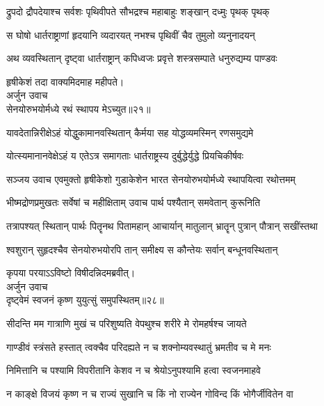 \twolineshloka
{द्रुपदो द्रौपदेयाश्च सर्वशः पृथिवीपते}
{सौभद्रश्च महाबाहुः शङ्खान् दध्मुः पृथक् पृथक्}%

\twolineshloka
{स घोषो धार्तराष्ट्राणां हृदयानि व्यदारयत्}
{नभश्च पृथिवीं चैव तुमुलो व्यनुनादयन्}%

\twolineshloka
{अथ व्यवस्थितान् दृष्ट्वा धार्तराष्ट्रान् कपिध्वजः}
{प्रवृत्ते शस्त्रसम्पाते धनुरुद्यम्य पाण्डवः}%


{हृषीकेशं तदा वाक्यमिदमाह महीपते।}\\
{अर्जुन उवाच}\\
{सेनयोरुभयोर्मध्ये रथं स्थापय मेऽच्युत॥२१॥}\\%

\twolineshloka
{यावदेतान्निरीक्षेऽहं योद्धुकामानवस्थितान्}
{कैर्मया सह योद्धव्यमस्मिन् रणसमुद्यमे}%

\twolineshloka
{योत्स्यमानानवेक्षेऽहं य एतेऽत्र समागताः}
{धार्तराष्ट्रस्य दुर्बुद्धेर्युद्धे प्रियचिकीर्षवः}%

{सञ्जय उवाच}
\twolineshloka
{एवमुक्तो हृषीकेशो गुडाकेशेन भारत}
{सेनयोरुभयोर्मध्ये स्थापयित्वा रथोत्तमम्}%

\twolineshloka
{भीष्मद्रोणप्रमुखतः सर्वेषां च महीक्षिताम्}
{उवाच पार्थ पश्यैतान् समवेतान् कुरूनिति}%

\twolineshloka
{तत्रापश्यत् स्थितान् पार्थः पितॄनथ पितामहान्}
{आचार्यान् मातुलान् भ्रातॄन् पुत्रान् पौत्रान् सखींस्तथा}%

\twolineshloka
{श्वशुरान् सुहृदश्चैव सेनयोरुभयोरपि}
{तान् समीक्ष्य स कौन्तेयः सर्वान् बन्धूनवस्थितान्}%

{कृपया परयाऽऽविष्टो विषीदन्निदमब्रवीत्।}\\
{अर्जुन उवाच}\\
{दृष्ट्वेमं स्वजनं कृष्ण युयुत्सुं समुपस्थितम्॥२८॥}%

\twolineshloka
{सीदन्ति मम गात्राणि मुखं च परिशुष्यति}
{वेपथुश्च शरीरे मे रोमहर्षश्च जायते}%

\twolineshloka
{गाण्डीवं स्त्रंसते हस्तात् त्वक्चैव परिदह्यते}
{न च शक्नोम्यवस्थातुं भ्रमतीव च मे मनः}%

\twolineshloka
{निमित्तानि च पश्यामि विपरीतानि केशव}
{न च श्रेयोऽनुपश्यामि हत्वा स्वजनमाहवे}%

\twolineshloka
{न काङ्क्षे विजयं कृष्ण न च राज्यं सुखानि च}
{किं नो राज्येन गोविन्द किं भोगैर्जीवितेन वा}%

